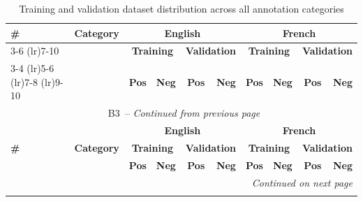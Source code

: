 {\footnotesize
{}
\setcounter{table}{2}
\renewcommand{\thetable}{B3}
\begin{longtable}{p{0.5cm}p{5.5cm}rrrrrrrr}
\caption{Training and validation dataset distribution across all annotation categories}
\label{tab:training_distribution}
 \\
\toprule
\multirow{3}{*}{\textbf{\#}} & \multirow{3}{*}{\textbf{Category}} & \multicolumn{4}{c}{\textbf{English}} & \multicolumn{4}{c}{\textbf{French}} \\
\cmidrule(lr){3-6} \cmidrule(lr){7-10}
& & \multicolumn{2}{c}{\textbf{Training}} & \multicolumn{2}{c}{\textbf{Validation}} & \multicolumn{2}{c}{\textbf{Training}} & \multicolumn{2}{c}{\textbf{Validation}} \\
\cmidrule(lr){3-4} \cmidrule(lr){5-6} \cmidrule(lr){7-8} \cmidrule(lr){9-10}
& & \textbf{Pos} & \textbf{Neg} & \textbf{Pos} & \textbf{Neg} & \textbf{Pos} & \textbf{Neg} & \textbf{Pos} & \textbf{Neg} \\
\midrule
\endfirsthead
\multicolumn{10}{c}{\tablename\ \thetable\ -- \textit{Continued from previous page}} \\
\toprule
\multirow{3}{*}{\textbf{\#}} & \multirow{3}{*}{\textbf{Category}} & \multicolumn{4}{c}{\textbf{English}} & \multicolumn{4}{c}{\textbf{French}} \\
\cmidrule(lr){3-6} \cmidrule(lr){7-10}
& & \multicolumn{2}{c}{\textbf{Training}} & \multicolumn{2}{c}{\textbf{Validation}} & \multicolumn{2}{c}{\textbf{Training}} & \multicolumn{2}{c}{\textbf{Validation}} \\
\cmidrule(lr){3-4} \cmidrule(lr){5-6} \cmidrule(lr){7-8} \cmidrule(lr){9-10}
& & \textbf{Pos} & \textbf{Neg} & \textbf{Pos} & \textbf{Neg} & \textbf{Pos} & \textbf{Neg} & \textbf{Pos} & \textbf{Neg} \\
\midrule
\endhead
\midrule
\multicolumn{10}{r}{\textit{Continued on next page}} \\
\endfoot
\bottomrule
\endlastfoot


\end{longtable}}
